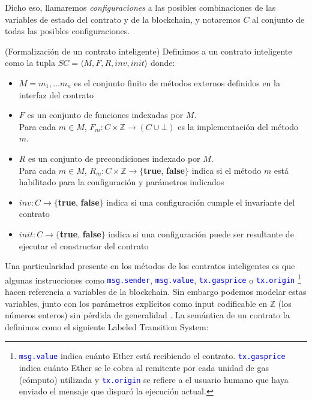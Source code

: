 Dicho eso, llamaremos \textit{configuraciones} a las posibles combinaciones de las variables de estado del contrato y de la blockchain, y notaremos $C$ al conjunto de todas las posibles configuraciones.

\begin{definition}(Formalización de un contrato inteligente)
    \label{definicion-smart-contract}
    Definimos a un contrato inteligente como la tupla $SC = \langle M, F, R, inv, init \rangle$ donde:

    \begin{itemize}
        \item $M = {m_1, \dots m_n}$ es el conjunto finito de métodos externos definidos en la interfaz del contrato
        \item $F$ es un conjunto de funciones indexadas por $M$. \\
              Para cada $m \in M$, $F_m : C \times \mathds{Z} \rightarrow (C \cup \bot)$ es la implementación del método $m$.
        \item $R$ es un conjunto de precondiciones indexado por $M$.\\
              Para cada $m \in M$, $R_m : C \times \mathds{Z} \rightarrow \{$\textbf{true}, \textbf{false}$\}$ indica si el método $m$ está habilitado para la configuración y parámetros indicados
        \item $inv : C \rightarrow \{$\textbf{true}, \textbf{false}$\}$ indica si una configuración cumple el invariante del contrato
        \item $init : C \rightarrow \{$\textbf{true}, \textbf{false}$\}$ indica si una configuración puede ser resultante de ejecutar el constructor del contrato
    \end{itemize}
\end{definition}

Una particularidad presente en los métodos de los contratos inteligentes es que algunas instrucciones como \textcolor{blue}{\texttt{msg.sender}}, \textcolor{blue}{\texttt{msg.value}}, \textcolor{blue}{\texttt{tx.gasprice}} o \textcolor{blue}{\texttt{tx.origin}}
\footnote{\textcolor{blue}{\texttt{msg.value}} indica cuánto Ether está recibiendo el contrato. \textcolor{blue}{\texttt{tx.gasprice}} indica cuánto Ether se le cobra al remitente por cada unidad de gas (cómputo) utilizada y \textcolor{blue}{\texttt{tx.origin}} se refiere a el usuario humano que haya enviado el mensaje que disparó la ejecución actual.} hacen referencia a variables de la blockchain.
Sin embargo podemos modelar estas variables, junto con los parámetros explícitos como input codificable en $\mathds{Z}$ (los números enteros) sin pérdida de generalidad \cite{de-caso-epa}.
La semántica de un contrato la definimos como el siguiente Labeled Transition System:

